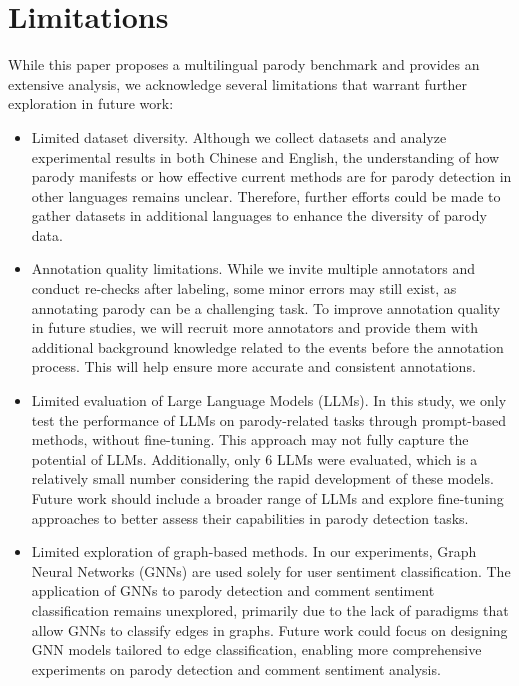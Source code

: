 \section*{Limitations}

While this paper proposes a multilingual parody benchmark and provides an extensive analysis, we acknowledge several limitations that warrant further exploration in future work:

\begin{itemize} 
\item Limited dataset diversity. Although we collect datasets and analyze experimental results in both Chinese and English, the understanding of how parody manifests or how effective current methods are for parody detection in other languages remains unclear. Therefore, further efforts could be made to gather datasets in additional languages to enhance the diversity of parody data.
\item Annotation quality limitations. While we invite multiple annotators and conduct re-checks after labeling, some minor errors may still exist, as annotating parody can be a challenging task. To improve annotation quality in future studies, we will recruit more annotators and provide them with additional background knowledge related to the events before the annotation process. This will help ensure more accurate and consistent annotations.
\item Limited evaluation of Large Language Models (LLMs). In this study, we only test the performance of LLMs on parody-related tasks through prompt-based methods, without fine-tuning. This approach may not fully capture the potential of LLMs. Additionally, only 6 LLMs were evaluated, which is a relatively small number considering the rapid development of these models. Future work should include a broader range of LLMs and explore fine-tuning approaches to better assess their capabilities in parody detection tasks.
\item Limited exploration of graph-based methods. In our experiments, Graph Neural Networks (GNNs) are used solely for user sentiment classification. The application of GNNs to parody detection and comment sentiment classification remains unexplored, primarily due to the lack of paradigms that allow GNNs to classify edges in graphs. Future work could focus on designing GNN models tailored to edge classification, enabling more comprehensive experiments on parody detection and comment sentiment analysis.
\end{itemize}

